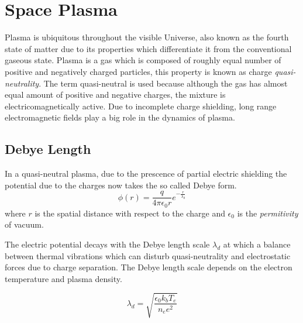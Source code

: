 \section{Space Plasma}\label{sec:plasma}

Plasma is ubiquitous throughout the visible Universe, also known as the fourth state of matter 
due to its properties which differentiate it from the conventional gaseous state. Plasma is a 
gas which is composed of roughly equal number of positive and negatively charged particles, this
property is known as charge \emph{quasi-neutrality}. The term quasi-neutral is used because although
the gas has almost equal amount of positive and negative charges, the mixture is electricomagnetically 
active. Due to incomplete charge shielding, long range electromagnetic fields play a big role in the 
dynamics of plasma.




\subsection*{Debye Length}

In a quasi-neutral plasma, due to the prescence of partial electric shielding the potential due to the charges
now takes the so called Debye form.
\begin{equation}
    \phi(r) = \frac{q}{4\pi\epsilon_0 r} e^{-\frac{r}{\lambda_d}}
\end{equation}
where $r$ is the spatial distance with respect to the charge and $\epsilon_0$ is the \emph{permitivity} of vacuum.


The electric potential decays with the Debye length scale $\lambda_d$ at which a balance between thermal vibrations 
which can disturb quasi-neutrality and electrostatic forces due to charge separation. The Debye length scale depends
on the electron temperature and plasma density.

\begin{equation}\label{eq:debye}
    \lambda_d = \sqrt{\frac{\epsilon_0 k_b T_e}{n_e e^2}}
\end{equation}

